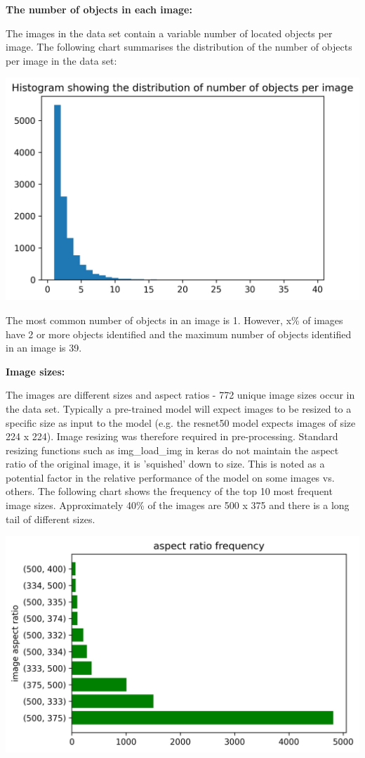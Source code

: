 \documentclass{article}
\begin{document}
\textbf{The number of objects in each image:}

The images in the data set contain a variable number of located objects per image. The following chart summarises the distribution of the number of objects per image in the data set:

\includegraphics[scale = 0.7]{hist_objects.jpg}

The most common number of objects in an image is 1. However, x\% of images have 2 or more objects identified and the maximum number of objects identified in an image is 39.


\textbf{Image sizes:}

The images are different sizes and aspect ratios - 772 unique image sizes occur in the data set. Typically a pre-trained model will expect images to be resized to a specific size as input to the model (e.g. the resnet50 model expects images of size 224 x 224). Image resizing was therefore required in pre-processing. Standard resizing functions such as img_load_img in keras do not maintain the aspect ratio of the original image, it is 'squished' down to size. This is noted as a potential factor in the relative performance of the model on some images vs. others. The following chart shows the frequency of the top 10 most frequent image sizes. Approximately 40\% of the images are 500 x 375 and there is a long tail of different sizes.

\includegraphics[scale = 0.7]{aspect_ratio.jpg}
\end{document}
